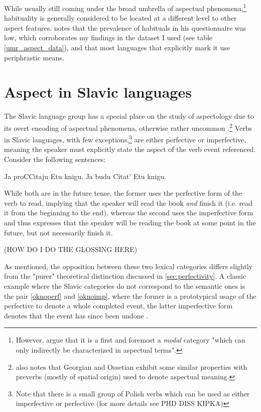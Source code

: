 While usually still coming under the broad umbrella of aspectual phenomena,\footnote{However, \citet{10.1093/acprof:oso/9780199544325.003.0016} argue that it is a first and foremost a \emph{modal} category "which can only indirectly be characterized in aspectual terms".} habituality is generally considered to be located at a different level to other aspect features. \citet{Dahl1985TenseAA} notes that the prevalence of habituals in his questionnaire was low, which corroborates my findings in the dataset I used (see table \ref{umr_aspect_data}), and that most languages that explicitly mark it use periphrastic means.

\section{Aspect in Slavic languages}
\label{sec:asp_in_slav_lang}
The Slavic language group has a special place on the study of aspectology due to its overt encoding of aspectual phenomena, otherwise rather uncommon \citep{slavstyleaspect}.\footnote{\citet{slavstyleaspect} also notes that Georgian and Ossetian exhibit some similar properties with preverbs (mostly of spatial origin) used to denote aspectual meaning.} Verbs in Slavic languages, with few exceptions,\footnote{Note that there is a small group of Polish verbs which can be used as either imperfective or perfective (for more details see PHD DISS KIPKA)} are either perfective or imperfective, meaning the speaker must explicitly state the aspect of the verb event referenced. Consider the following sentences:

\begin{exe}
    \ex Ja proCCitaju Etu knigu.
    \label{sent:japrocit}
    \ex Ja budu Citat' Etu knigu.
    \label{sent:jabuducitat}
\end{exe}

While both are in the future tense, the former uses the perfective form of the verb to read, implying that the speaker will read the book \emph{and} finish it (i.e. read it from the beginning to the end), whereas the second uses the imperfective form and thus expresses that the speaker will be reading the book at some point in the future, but not necessarily finish it.

(HOW DO I DO THE GLOSSING HERE)

As mentioned, the opposition between these two lexical categories differs slightly from the "purer" theoretical distinction discussed in \ref{sec:perfectivity}. A classic example where the Slavic categories do not correspond to the semantic ones is the pair \ref{oknoperf} and \ref{oknoimp}, where the former is a prototypical usage of the perfective to denote a whole completed event, the latter imperfective form denotes that the event has since been undone \citep{franks2005slavic}.

